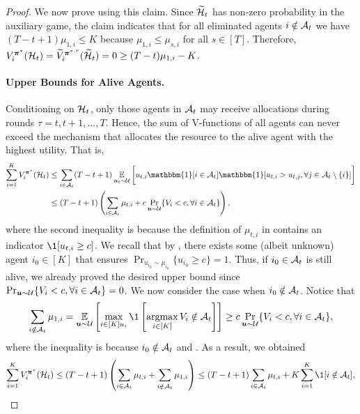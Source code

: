 \begin{proof}
We now prove  using this claim. Since $\widetilde{\mathcal{H}}_t$ has non-zero probability in the auxiliary game, the claim indicates that for all eliminated agents $i\notin \mathcal{A}_t$ we have $(T-t+1)\mu_{1,i}\leq K$ because $\mu_{1,i}\le \mu_{s,i}$ for all $s\in [T]$. Therefore, $V_i^{\bm \pi^\ast}(\mathcal{H}_t) = \widetilde V_i^{{\bm \pi}^{\ast,r}}(\widetilde{\mathcal{H}}_t) = 0\ge (T-t)\mu_{1,i}-K$.

\paragraph{Upper Bounds for Alive Agents.}
Conditioning on $\mathcal{H}_t$, only those agents in $\mathcal{A}_t$ may receive allocations during rounds $\tau=t,t+1,\ldots,T$. Hence, the sum of V-functions of all agents can never exceed the mechanism that allocates the resource to the alive agent with the highest utility. That is,
\begin{align*}
\sum_{i=1}^K V_i^{{\bm \pi}^\ast}(\mH_{t}) &\le \sum_{i\in\mA_t} (T-t+1)\E_{\bm u_t\sim \mV} \bigg[u_{t,i}\mathbbm{1}[i\in \mA_t] \mathbbm{1}[u_{t,i}>u_{t,j},\forall j\in \mA_t\setminus \{i\}] \bigg]\\
&\le (T-t+1)\left (\sum_{i\in\mA_t} \mu_{t,i} + c\Pr_{\bm u\sim \mV}\{V_i<c,\forall i\in\mA_t\}\right ),
\end{align*}
where the second inequality is because the definition of $\mu_{t,i}$ in  contains an indicator $\1[u_{t,i}\ge c]$.
We recall that by , there exists some (albeit unknown) agent $i_0\in [K]$ that ensures $\Pr_{u_{i_0}\sim\mu_{i_0}} \{u_{i_0}\geq c\}=1$. Thus, if $i_0\in \mathcal{A}_t$ is still alive, we already proved the desired upper bound since $\Pr_{\bm u\sim \mathcal{U}}\{V_i<c,\forall i\in\mathcal{A}_t\}=0$. We now consider the case when $i_0\notin\mathcal{A}_t$. Notice that
\begin{equation*}
    \sum_{i\notin\mA_t}\mu_{1,i}=\E_{\bm u\sim \mV}\sqb{\max_{i\in [K] u_{i}}\1\sqb{\argmax_{i\in [K]} V_i \notin \mA_t}}\ge c\Pr_{\bm u\sim \mV}\{V_i<c,\forall i\in\mA_t\},
\end{equation*}
where the inequality is because $i_0\notin \mathcal{A}_t$ and .
As a result, we obtained
\begin{equation}\label{eq:upper_bound_max_welfare}
    \sum_{i=1}^K V_i^{{\bm \pi}^\ast}(\mH_{t}) \leq (T-t+1)\left (\sum_{i\in\mA_t} \mu_{t,i}+\sum_{i\notin\mA_t} \mu_{1,i}\right ) \leq (T-t+1)\sum_{i\in\mA_t} \mu_{t,i} + K\sum_{i=1}^K \1[i\notin \mA_t],
\end{equation}

\end{proof}
